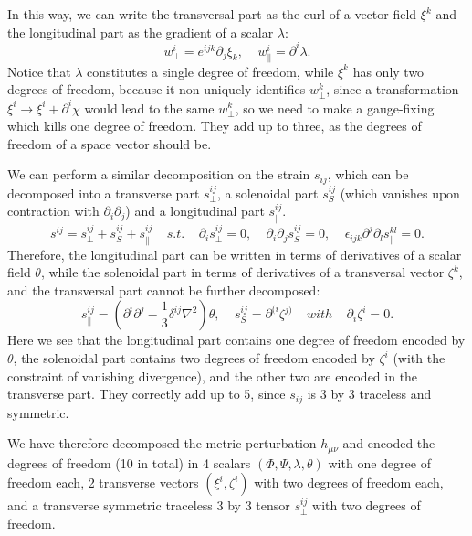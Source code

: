 \documentclass[a4paper]{article}
\begin{document}
In this way, we can write the transversal part as the curl of a vector field $\xi^k$ and the longitudinal part as the gradient of a scalar $\lambda$:
\begin{equation}
  w^i_{\bot} = e^{ijk}\partial_j \xi_k,\ \ \ \ \ w_{\parallel}^i = \partial^i \lambda.
\end{equation}
Notice that $\lambda$ constitutes a single degree of freedom, while $\xi^k$ has only two degrees of freedom, because it non-uniquely identifies $w^k_{\bot}$, since a transformation $\xi^i \rightarrow \xi^i + \partial^i \chi$ would lead to the same $w^k_{\bot}$, so we need to make a gauge-fixing which kills one degree of freedom. They add up to three, as the degrees of freedom of a space vector should be.

We can perform a similar decomposition on the strain $s_{ij}$, which can be decomposed into a transverse part $s^{ij}_{\bot}$, a solenoidal part $s_S^{ij}$ (which vanishes upon contraction with $\partial_i\partial_j$) and a longitudinal part $s_{\parallel}^{ij}$.
\begin{equation}
  s^{ij} = s^{ij}_{\bot} + s_S^{ij} + s^{ij}_{\parallel}\ \ \ \ \ s.t.\ \ \ \ \ \partial_i s^{ij}_{\bot} = 0,\ \ \ \ \ \partial_i \partial_j s^{ij}_S = 0,\ \ \ \ \ \epsilon_{ijk}\partial^j\partial_l s^{kl}_{\parallel} = 0.
\end{equation}
Therefore, the longitudinal part can be written in terms of derivatives of a scalar field $\theta$, while the solenoidal part in terms of derivatives of a transversal vector $\zeta^k$, and the transversal part cannot be further decomposed:
\begin{equation}
  s_{\parallel}^{ij} =\left(\partial^i\partial^j - \frac{1}{3}\delta^{ij}\nabla^2\right)\theta,\ \ \ \ \ s_{S}^{ij} = \partial^{(i}\zeta^{j)}\ \ \ \ \ with\ \ \ \ \ \partial_i \zeta^i = 0.
\end{equation}
Here we see that the longitudinal part contains one degree of freedom encoded by $\theta$, the solenoidal part contains two degrees of freedom encoded by $\zeta^i$ (with the constraint of vanishing divergence), and the other two are encoded in the transverse part. They correctly add up to 5, since $s_{ij}$ is 3 by 3 traceless and symmetric.

We have therefore decomposed the metric perturbation $h_{\mu\nu}$ and encoded the degrees of freedom (10 in total) in 4 scalars $(\Phi, \Psi, \lambda, \theta)$ with one degree of freedom each, 2 transverse vectors $(\xi^i, \zeta^i)$ with two degrees of freedom each, and a transverse symmetric traceless 3 by 3 tensor $s^{ij}_{\bot}$ with two degrees of freedom.
\end{document}
